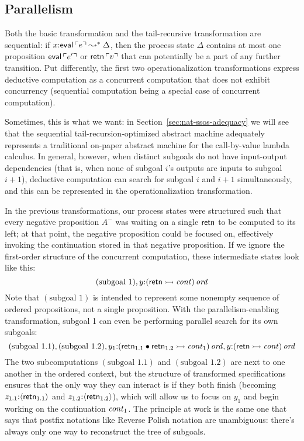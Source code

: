 \subsection{Parallelism}
\label{sec:trans-par}

Both the basic transformation and the tail-recursive transformation
are sequential: if $x{:}{\sf eval}\,{\ulcorner{e}\urcorner} \leadsto^* \Delta$,
then the process state $\Delta$ contains at most one proposition ${\sf
  eval}\,{\ulcorner{e'}\urcorner}$ or ${\sf retn}\,{\ulcorner{v}\urcorner}$ that can potentially
be a part of any further transition. Put differently, the first two
operationalization transformations express deductive computation as a
concurrent computation that does not exhibit concurrency (sequential
computation being a special case of concurrent computation).

Sometimes, this is what we want: in
Section~\ref{sec:nat-ssos-adequacy} we will see that the sequential
tail-recursion-optimized abstract machine 
adequately represents a traditional on-paper abstract machine for
the call-by-value lambda calculus. In general, however, when distinct
subgoals do not have input-output dependencies (that is, when none of
subgoal $i$'s outputs are inputs to subgoal $i+1$), deductive computation
can search for subgoal $i$ and $i+1$ simultaneously, and this can 
be represented in the operationalization transformation.

In the previous transformations, our process states were structured
such that every negative proposition $A^-$ was waiting on a single
${\sf retn}$ to be computed to its left; at that point, the negative
proposition could be focused on, effectively invoking the
continuation stored in that negative proposition. If we ignore the
first-order structure of the concurrent computation, these
intermediate states look like this:
\[
  (\mbox{subgoal 1}), y{:}{({\sf retn} \rightarrowtail {\it cont})}\,{{\it ord}}
\]
Note that $(\mbox{subgoal 1})$ is intended to represent some nonempty
sequence of ordered propositions, not a single proposition. With the
parallelism-enabling transformation, subgoal 1 can even be performing
parallel search for its own subgoals:
\[
 (\mbox{subgoal 1.1}), (\mbox{subgoal 1.2}), 
   y_1{:}{({\sf retn}_{1.1} \mathbin{\bullet} {\sf retn}_{1.2} \rightarrowtail {\it cont}_1)}\,{{\it ord}}, 
   y{:}{({\sf retn} \rightarrowtail {\it cont})}\,{{\it ord}}
\]
The two subcomputations $(\mbox{subgoal 1.1})$ and $(\mbox{subgoal
  1.2})$ are next to one another in the ordered context, but the
structure of transformed specifications ensures that the only way they
can interact is if they both finish (becoming $z_{1.1}{:}\langle {{\sf
    retn}_{1.1}} \rangle$ and $z_{1.2}{:}\langle {{\sf retn}_{1.2}} \rangle$), which will
allow us to focus on $y_1$ and begin working on the continuation ${\it
  cont}_1$. The principle at work is the same one that says that postfix
notations like Reverse Polish notation are unambiguous: there's always
only one way to reconstruct the tree of subgoals. 

